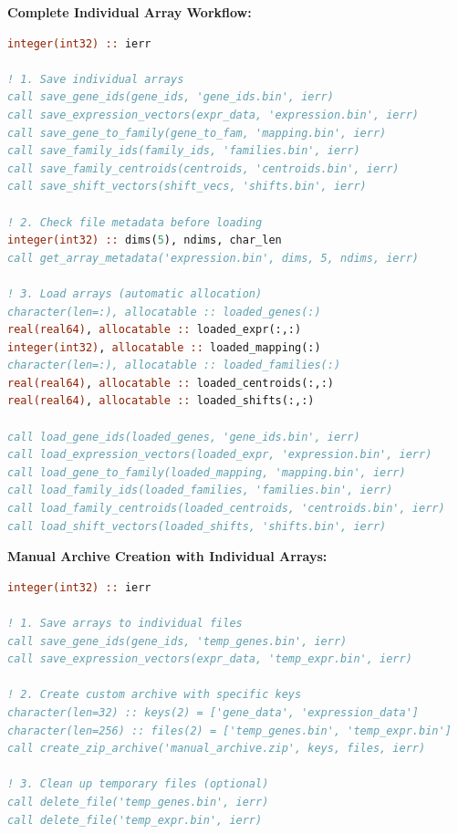\documentclass[11pt]{article}
\begin{document}
\begin{enumerate}
\begin{itemize}
	      	      \textbf{Complete Individual Array Workflow:}
	      	      \begin{lstlisting}[language=Fortran, caption={Individual Array Save/Load Workflow}]
integer(int32) :: ierr

! 1. Save individual arrays
call save_gene_ids(gene_ids, 'gene_ids.bin', ierr)
call save_expression_vectors(expr_data, 'expression.bin', ierr)
call save_gene_to_family(gene_to_fam, 'mapping.bin', ierr)
call save_family_ids(family_ids, 'families.bin', ierr)
call save_family_centroids(centroids, 'centroids.bin', ierr)
call save_shift_vectors(shift_vecs, 'shifts.bin', ierr)

! 2. Check file metadata before loading
integer(int32) :: dims(5), ndims, char_len
call get_array_metadata('expression.bin', dims, 5, ndims, ierr)

! 3. Load arrays (automatic allocation)
character(len=:), allocatable :: loaded_genes(:)
real(real64), allocatable :: loaded_expr(:,:)
integer(int32), allocatable :: loaded_mapping(:)
character(len=:), allocatable :: loaded_families(:)
real(real64), allocatable :: loaded_centroids(:,:)
real(real64), allocatable :: loaded_shifts(:,:)

call load_gene_ids(loaded_genes, 'gene_ids.bin', ierr)
call load_expression_vectors(loaded_expr, 'expression.bin', ierr)
call load_gene_to_family(loaded_mapping, 'mapping.bin', ierr)
call load_family_ids(loaded_families, 'families.bin', ierr)
call load_family_centroids(loaded_centroids, 'centroids.bin', ierr)
call load_shift_vectors(loaded_shifts, 'shifts.bin', ierr)
	      	      \end{lstlisting}
	      	      
	      	      \textbf{Manual Archive Creation with Individual Arrays:}
	      	      \begin{lstlisting}[language=Fortran, caption={Manual Archive Creation}]
integer(int32) :: ierr

! 1. Save arrays to individual files
call save_gene_ids(gene_ids, 'temp_genes.bin', ierr)
call save_expression_vectors(expr_data, 'temp_expr.bin', ierr)

! 2. Create custom archive with specific keys
character(len=32) :: keys(2) = ['gene_data', 'expression_data']
character(len=256) :: files(2) = ['temp_genes.bin', 'temp_expr.bin']
call create_zip_archive('manual_archive.zip', keys, files, ierr)

! 3. Clean up temporary files (optional)
call delete_file('temp_genes.bin', ierr)
call delete_file('temp_expr.bin', ierr)
	      	      \end{lstlisting}
	      	      

\end{itemize}
\end{enumerate}
\end{document}
